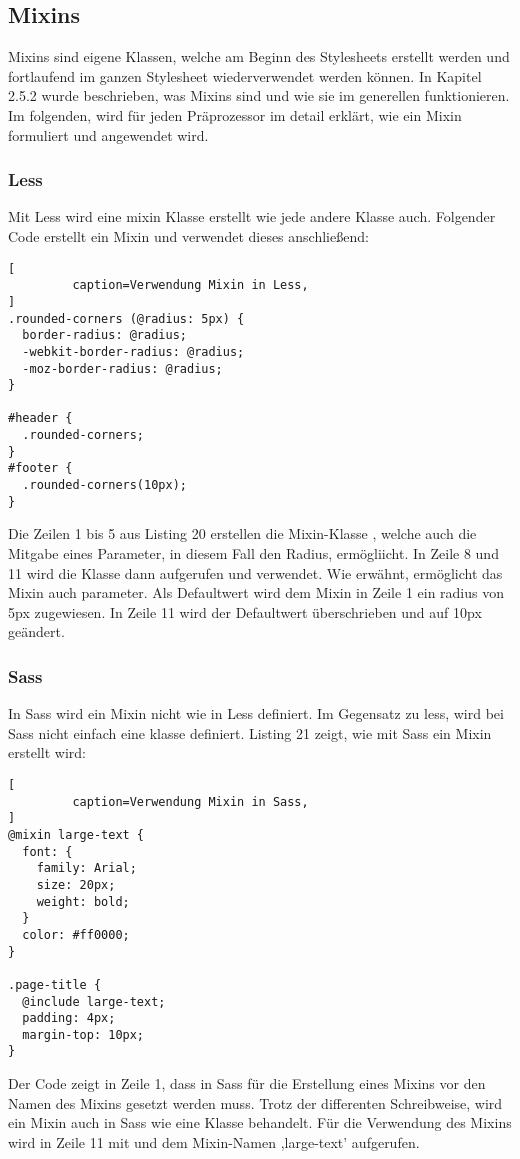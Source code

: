 \subsection{Mixins}
Mixins sind eigene Klassen, welche am Beginn des Stylesheets erstellt werden und fortlaufend im ganzen Stylesheet wiederverwendet werden können. \newline
In Kapitel 2.5.2 wurde beschrieben, was Mixins sind und wie sie im generellen funktionieren. Im folgenden, wird für jeden Präprozessor im detail erklärt, wie ein Mixin formuliert und angewendet wird.
\subsubsection{Less}
Mit Less wird eine mixin Klasse erstellt wie jede andere Klasse auch. Folgender Code erstellt ein Mixin und verwendet dieses anschließend:
\begin{lstlisting}[
         caption=Verwendung Mixin in Less,
]
.rounded-corners (@radius: 5px) {
  border-radius: @radius;
  -webkit-border-radius: @radius;
  -moz-border-radius: @radius;
}

#header {
  .rounded-corners;
}
#footer {
  .rounded-corners(10px);
}
\end{lstlisting}
Die Zeilen 1 bis 5 aus Listing 20 erstellen die Mixin-Klasse \glqq{}, welche auch die Mitgabe eines Parameter, in diesem Fall den Radius, ermögliicht. \newline
In Zeile 8 und 11 wird die Klasse dann aufgerufen und verwendet. Wie erwähnt, ermöglicht das Mixin auch parameter. Als Defaultwert wird dem Mixin in Zeile 1 ein radius von 5px zugewiesen. In Zeile 11 wird der Defaultwert überschrieben und auf 10px geändert.
\subsubsection{Sass}
In Sass wird ein Mixin nicht wie in Less definiert. Im Gegensatz zu less, wird bei Sass nicht einfach eine klasse definiert. Listing 21 zeigt, wie mit Sass ein Mixin erstellt wird:
\begin{lstlisting}[
         caption=Verwendung Mixin in Sass,
]
@mixin large-text {
  font: {
    family: Arial;
    size: 20px;
    weight: bold;
  }
  color: #ff0000;
}

.page-title {
  @include large-text;
  padding: 4px;
  margin-top: 10px;
}
\end{lstlisting}
Der Code zeigt in Zeile 1, dass in Sass für die Erstellung eines Mixins \glqq{} vor den Namen des Mixins gesetzt werden muss. Trotz der differenten Schreibweise, wird ein Mixin auch in Sass wie eine Klasse behandelt. \newline
Für die Verwendung des Mixins wird in Zeile 11 mit \glqq{} und dem Mixin-Namen ,large-text' aufgerufen. 
